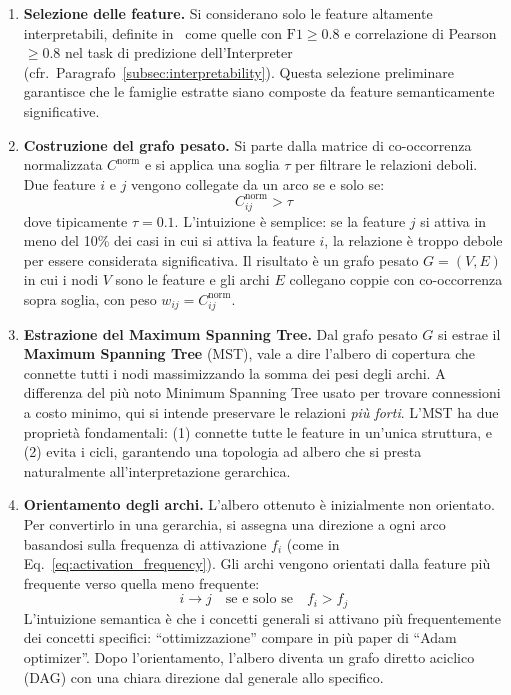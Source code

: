 \begin{enumerate}
    \item \textbf{Selezione delle feature.} Si considerano solo le feature altamente interpretabili, definite in~\parencite{oneill2024disentangling} come quelle con $\text{F1} \geq 0.8$ e correlazione di Pearson $\geq 0.8$ nel task di predizione dell'Interpreter (cfr.\ Paragrafo~\ref{subsec:interpretability}). Questa selezione preliminare garantisce che le famiglie estratte siano composte da feature semanticamente significative.
    
    \item \textbf{Costruzione del grafo pesato.} Si parte dalla matrice di co-occorrenza normalizzata $C^{\text{norm}}$ e si applica una soglia $\tau$ per filtrare le relazioni deboli. Due feature $i$ e $j$ vengono collegate da un arco se e solo se:
    \begin{equation}
        C^{\text{norm}}_{ij} > \tau
        \label{eq:threshold}
    \end{equation}
    dove tipicamente $\tau = 0.1$. L'intuizione è semplice: se la feature $j$ si attiva in meno del 10\% dei casi in cui si attiva la feature $i$, la relazione è troppo debole per essere considerata significativa. Il risultato è un grafo pesato $G = (V, E)$ in cui i nodi $V$ sono le feature e gli archi $E$ collegano coppie con co-occorrenza sopra soglia, con peso $w_{ij} = C^{\text{norm}}_{ij}$.
    
    \item \textbf{Estrazione del Maximum Spanning Tree.} Dal grafo pesato $G$ si estrae il \textbf{Maximum Spanning Tree} (MST), vale a dire l'albero di copertura che connette tutti i nodi massimizzando la somma dei pesi degli archi. A differenza del più noto Minimum Spanning Tree usato per trovare connessioni a costo minimo, qui si intende preservare le relazioni \textit{più forti}. L'MST ha due proprietà fondamentali: (1) connette tutte le feature in un'unica struttura, e (2) evita i cicli, garantendo una topologia ad albero che si presta naturalmente all'interpretazione gerarchica.
    
    \item \textbf{Orientamento degli archi.} L'albero ottenuto è inizialmente non orientato. Per convertirlo in una gerarchia, si assegna una direzione a ogni arco basandosi sulla frequenza di attivazione $f_i$ (come in Eq.~\ref{eq:activation_frequency}). Gli archi vengono orientati dalla feature più frequente verso quella meno frequente:
    \begin{equation}
        i \to j \quad \text{se e solo se} \quad f_i > f_j
        \label{eq:edge_orientation}
    \end{equation}
    L'intuizione semantica è che i concetti generali si attivano più frequentemente dei concetti specifici: ``ottimizzazione'' compare in più paper di ``Adam optimizer''. Dopo l'orientamento, l'albero diventa un grafo diretto aciclico (DAG) con una chiara direzione dal generale allo specifico.
\end{enumerate}

